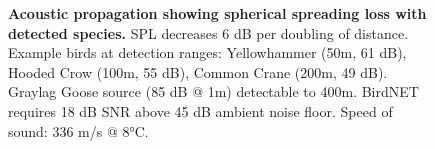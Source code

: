 \documentclass[twocolumn]{article}
\begin{document}
\begin{figure}[h]
\caption{\textbf{Acoustic propagation showing spherical spreading loss with detected species.} SPL decreases 6 dB per doubling of distance. Example birds at detection ranges: Yellowhammer (50m, 61 dB), Hooded Crow (100m, 55 dB), Common Crane (200m, 49 dB). Graylag Goose source (85 dB @ 1m) detectable to 400m. BirdNET requires 18 dB SNR above 45 dB ambient noise floor. Speed of sound: 336 m/s @ 8°C.}
\label{fig:acoustic_dropoff}
\end{figure}
\end{document}

